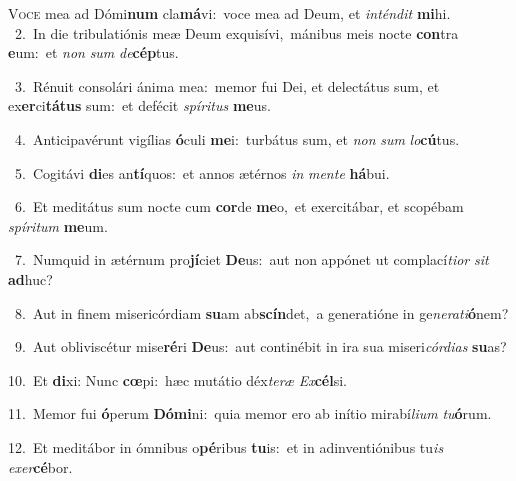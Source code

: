 \lettrine{\initial\textcolor{\initialcolor}{V}}{oce} mea ad Dómi\textbf{num} cla\-\textbf{má}\-vi:~\star voce mea ad Deum, et \textit{in}\-\textit{tén}\textit{dit} \textbf{mi}\-hi.\\
{\numbfont\textcolor{\numbcolor}{~2.}}~In die tribulatiónis meæ Deum exquisívi,~\dagger mánibus meis nocte \textbf{con}\-tra \textbf{e}\-um:~\star et \textit{non} \textit{sum} \textit{de}\-\textbf{cép}tus.\par
{\numbfont\textcolor{\numbcolor}{~3.}}~Rénuit consolári ánima mea:~\dagger memor fui Dei, et delectátus sum, et ex\-\textbf{er}\-ci\-\textbf{tá}\-\textbf{tus} sum:~\star et defécit \textit{spí}\-\textit{ri}\textit{tus} \textbf{me}\-us.\par
{\numbfont\textcolor{\numbcolor}{~4.}}~Anticipavérunt vigílias \textbf{ó}\-culi \textbf{me}\-i:~\star turbátus sum, et \textit{non} \textit{sum} \textit{lo}\-\textbf{cú}tus.\par
{\numbfont\textcolor{\numbcolor}{~5.}}~Cogitávi \textbf{di}\-es an\-\textbf{tí}\-quos:~\star et annos ætérnos \textit{in} \textit{men}\-\textit{te} \textbf{há}\-bui.\par
{\numbfont\textcolor{\numbcolor}{~6.}}~Et meditátus sum nocte cum \textbf{cor}\-de \textbf{me}\-o,~\star et exercitábar, et scopébam \textit{spí}\-\textit{ri}\textit{tum} \textbf{me}\-um.\par
{\numbfont\textcolor{\numbcolor}{~7.}}~Numquid in ætérnum pro\-\textbf{jí}\-ciet \textbf{De}\-us:~\star aut non appónet ut complací\-\textit{ti}\-\textit{or} \textit{sit} \textbf{ad}\-huc?\par
{\numbfont\textcolor{\numbcolor}{~8.}}~Aut in finem misericórdiam \textbf{su}\-am ab\-\textbf{scín}\-det,~\star a generatióne in ge\-\textit{ne}\-\textit{ra}\textit{ti}\textbf{ó}nem?\par
{\numbfont\textcolor{\numbcolor}{~9.}}~Aut obliviscétur mise\-\textbf{ré}\-ri \textbf{De}\-us:~\star aut continébit in ira sua miseri\-\textit{cór}\-\textit{di}\textit{as} \textbf{su}\-as?\par
{\numbfont\textcolor{\numbcolor}{10.}}~Et \textbf{di}\-xi: Nunc \textbf{cœ}\-pi:~\star hæc mutátio déx\-\textit{te}\-\textit{ræ} \textit{Ex}\-\textbf{cél}si.\par
{\numbfont\textcolor{\numbcolor}{11.}}~Memor fui \textbf{ó}\-perum \textbf{Dó}\-\textbf{mi}ni:~\star quia memor ero ab inítio mirabí\-\textit{li}\-\textit{um} \textit{tu}\-\textbf{ó}rum.\par
{\numbfont\textcolor{\numbcolor}{12.}}~Et meditábor in ómnibus o\-\textbf{pé}\-ribus \textbf{tu}\-is:~\star et in adinventiónibus tu\textit{is} \textit{ex}\-\textit{er}\textbf{cé}bor.\par
